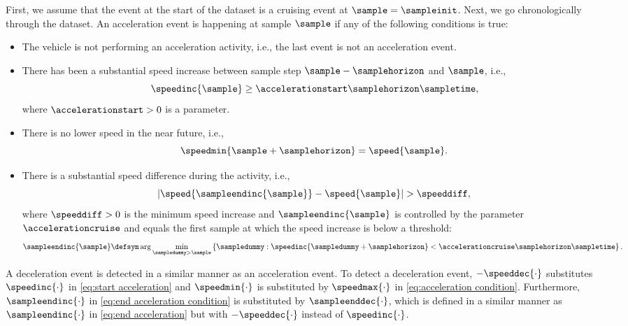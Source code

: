 First, we assume that the event at the start of the dataset is a cruising event at $\sample=\sampleinit$. Next, we go chronologically through the dataset. An acceleration event is happening at sample $\sample$ if any of the following conditions is true:
\begin{itemize}
	\item The vehicle is not performing an acceleration activity, i.e., the last event is not an acceleration event.
	\item \cstarta There has been a substantial speed increase between sample step $\sample-\samplehorizon$ and $\sample$, i.e., 
	\begin{equation}
		\label{eq:start acceleration}
		\speedinc{\sample} \geq \accelerationstart\samplehorizon\sampletime,
	\end{equation} \cenda
	where $\accelerationstart>0$ is a parameter.
	\item There is no lower speed in the near future, i.e.,
	\begin{equation}
		\label{eq:acceleration condition}
		\speedmin{\sample+\samplehorizon}=\speed{\sample}.
	\end{equation}
	\item There is a substantial speed difference during the activity, i.e., 
	\begin{equation}
		\label{eq:end acceleration condition}
		\left|\speed{\sampleendinc{\sample}} - \speed{\sample}\right| > \speeddiff,
	\end{equation}
	where \cstartc $\speeddiff>0$ is the minimum speed increase and \cendc $\sampleendinc{\sample}$ is controlled by the parameter $\accelerationcruise$ and \cstarta equals the first sample at which the speed increase is below a threshold\cenda:
	\begin{equation}
		\label{eq:end acceleration}
		\sampleendinc{\sample} \defsym \arg \min_{\sampledummy > \sample} \left\{ \sampledummy: \speedinc{\sampledummy+\samplehorizon} < \accelerationcruise\samplehorizon\sampletime \right\}.
	\end{equation}
\end{itemize}

\cstartd
A deceleration event is detected in a similar manner as an acceleration event. To detect a deceleration event, $-\speeddec{\cdot}$ substitutes $\speedinc{\cdot}$ in \cref{eq:start acceleration} and $\speedmin{\cdot}$ is substituted by $\speedmax{\cdot}$ in \cref{eq:acceleration condition}. Furthermore, $\sampleendinc{\cdot}$ in \cref{eq:end acceleration condition} is substituted by $\sampleenddec{\cdot}$, which is defined in a similar manner as $\sampleendinc{\cdot}$ in \cref{eq:end acceleration} but with $-\speeddec{\cdot}$ instead of $\speedinc{\cdot}$.\cendd

